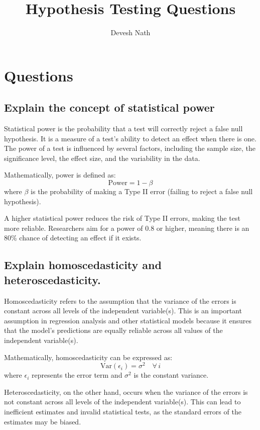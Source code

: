\documentclass[12pt]{article}
\title{Hypothesis Testing Questions}
\author{Devesh Nath}
\date{}
\begin{document}
\maketitle

\section{Questions}
\subsection{Explain the concept of statistical power}

Statistical power is the probability that a test will correctly reject a false null hypothesis. It is a measure of a test's ability to detect an effect when there is one. The power of a test is influenced by several factors, including the sample size, the significance level, the effect size, and the variability in the data.

Mathematically, power is defined as:
\[
\mathrm{Power} = 1 - \beta
\]
where \(\beta\) is the probability of making a Type II error (failing to reject a false null hypothesis).

A higher statistical power reduces the risk of Type II errors, making the test more reliable. Researchers aim for a power of 0.8 or higher, meaning there is an 80\% chance of detecting an effect if it exists.

\subsection{Explain homoscedasticity and heteroscedasticity.}

Homoscedasticity refers to the assumption that the variance of the errors is constant across all levels of the independent variable(s). This is an important assumption in regression analysis and other statistical models because it ensures that the model's predictions are equally reliable across all values of the independent variable(s).

Mathematically, homoscedasticity can be expressed as:
\[
\mathrm{Var}(\epsilon_i) = \sigma^2 \quad \forall \, i
\]
where \(\epsilon_i\) represents the error term and \(\sigma^2\) is the constant variance.

Heteroscedasticity, on the other hand, occurs when the variance of the errors is not constant across all levels of the independent variable(s). This can lead to inefficient estimates and invalid statistical tests, as the standard errors of the estimates may be biased.
\end{document}
